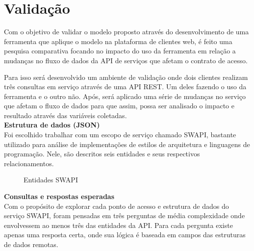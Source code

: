 \section{Validação}

Com o objetivo de validar o modelo proposto através do desenvolvimento de uma ferramenta que aplique o modelo na plataforma de clientes web, é feito uma pesquisa comparativa focando no impacto do uso da ferramenta em relação a mudanças no fluxo de dados da API de serviços que afetam o contrato de acesso.

Para isso será desenvolvido um ambiente de validação onde dois clientes realizam três consultas em serviço através de uma API REST. Um deles fazendo o uso da ferramenta e o outro não. Após, será aplicado uma série de mudanças no serviço que afetam o fluxo de dados para que assim, possa ser analisado o impacto e resultado através das  variáveis coletadas. \\

\textbf{Estrutura de dados (JSON)} \\

Foi escolhido trabalhar com um escopo de serviço chamado SWAPI, bastante utilizado para análise de implementações de estilos de arquitetura e linguagens de programação. Nele, são descritos seis entidades e seus respectivos relacionamentos.

\begin{figure}[H]
  \centering
  \caption{Entidades SWAPI}
\end{figure}

\textbf{Consultas e respostas esperadas} \\

Com o propósito de explorar cada ponto de acesso e estrutura de dados do serviço SWAPI, foram pensadas em três perguntas de média complexidade onde envolvessem ao menos três das entidades da API. Para cada pergunta existe apenas uma resposta certa, onde sua lógica é baseada em campos das estruturas de dados remotas.

